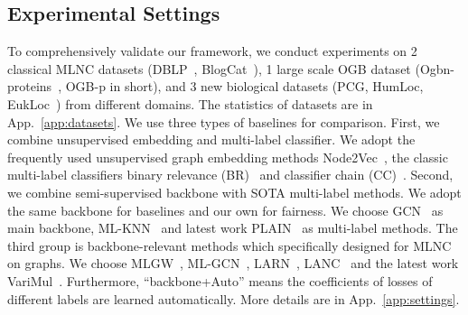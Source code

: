 \subsection{Experimental Settings}
To comprehensively validate our framework, we conduct experiments on 2 classical MLNC datasets (DBLP~\citep{8970680}, BlogCat~\citep{8894391}), 1 large scale OGB dataset (Ogbn-proteins~\citep{hu2020open}, OGB-p in short), and 3 new biological datasets (PCG, HumLoc, EukLoc~\citep{zhao2023multi}) from different domains. The statistics of datasets are in App.~\ref{app:datasets}.
We use three types of baselines for comparison.
First, we combine unsupervised embedding and multi-label classifier. We adopt the frequently used unsupervised graph embedding methods Node2Vec~\citep{grover2016node2vec}, the classic multi-label classifiers binary relevance (BR)~\citep{Tsoumakas2010MiningMD} and classifier chain (CC)~\citep{10.1007/978-3-642-04174-7_17}.
Second, we combine semi-supervised backbone with SOTA multi-label methods.
We adopt the same backbone for baselines and our own for fairness. 
We choose GCN~\citep{kipf2017semisupervised} as main backbone, ML-KNN~\citep{10.1016/j.patcog.2006.12.019} and latest work PLAIN~\citep{wang2023deep} as multi-label methods.
The third group is backbone-relevant methods which specifically designed for MLNC on graphs. 
We choose MLGW~\citep{8970680}, ML-GCN~\citep{gao2019semisupervised}, LARN~\citep{XIAO2022235}, LANC~\citep{ZHOU2021115063} and the latest work VariMul~\citep{10.1145/3459637.3482391}.
Furthermore, 
``backbone+Auto'' means the coefficients of losses of different labels are learned automatically.
More details are in App.~\ref{app:settings}.



